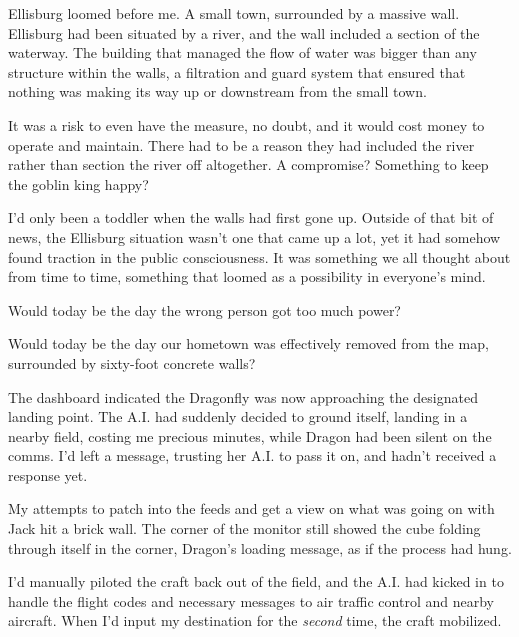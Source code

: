 





Ellisburg loomed before me.  A small town, surrounded by a massive wall.  Ellisburg had been situated by a river, and the wall included a section of the waterway.  The building that managed the flow of water was bigger than any structure within the walls, a filtration and guard system that ensured that nothing was making its way up or downstream from the small town.



It was a risk to even have the measure, no doubt, and it would cost money to operate and maintain.  There had to be a reason they had included the river rather than section the river off altogether.  A compromise?  Something to keep the goblin king happy?



I'd only been a toddler when the walls had first gone up.  Outside of that bit of news, the Ellisburg situation wasn't one that came up a lot, yet it had somehow found traction in the public consciousness.  It was something we all thought about from time to time, something that loomed as a possibility in everyone's mind.



Would today be the day the wrong person got too much power?



Would today be the day our hometown was effectively removed from the map, surrounded by sixty-foot concrete walls?



The dashboard indicated the Dragonfly was now approaching the designated landing point.  The A.I. had suddenly decided to ground itself, landing in a nearby field, costing me precious minutes, while Dragon had been silent on the comms.  I'd left a message, trusting her A.I. to pass it on, and hadn't received a response yet.



My attempts to patch into the feeds and get a view on what was going on with Jack hit a brick wall.  The corner of the monitor still showed the cube folding through itself in the corner, Dragon's loading message, as if the process had hung.



I'd manually piloted the craft back out of the field, and the A.I. had kicked in to handle the flight codes and necessary messages to air traffic control and nearby aircraft.  When I'd input my destination for the \emph{second} time, the craft mobilized.



